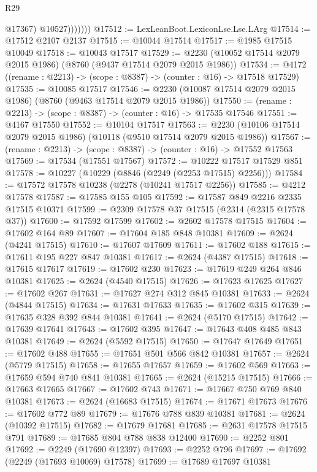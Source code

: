 \begin{lexlean}{R29}
\begin{coremodule}
                    @17367)
                  @10527)))))))
@17512 := LexLeanBoot.LexiconLse.Lse.LArg
@17514 := @17512 @2107 @2137
@17515 := @10044 @17514
@17517 := @1985 @17515 @10049
@17518 := @10043 @17517
@17529 := @2230 (@10052 @17514 @2079 @2015 @1986) (@8760 (@9437 @17514 @2079 @2015 @1986))
@17534 := @4172 ((rename : @2213) -> (scope : @8387) -> (counter : @16) -> @17518 @17529)
@17535 := @10085 @17517
@17546 := @2230 (@10087 @17514 @2079 @2015 @1986) (@8760 (@9463 @17514 @2079 @2015 @1986))
@17550 := (rename : @2213) -> (scope : @8387) -> (counter : @16) -> @17535 @17546
@17551 := @4167 @17550
@17552 := @10104 @17517
@17563 := @2230 (@10106 @17514 @2079 @2015 @1986) (@10118 (@9510 @17514 @2079 @2015 @1986))
@17567 := (rename : @2213) -> (scope : @8387) -> (counter : @16) -> @17552 @17563
@17569 := @17534 (@17551 @17567)
@17572 := @10222 @17517 @17529 @851
@17578 := @10227 (@10229 (@8846 (@2249 (@2253 @17515) @2256)))
@17584 := @17572 @17578 @10238 (@2278 (@10241 @17517 @2256))
@17585 := @4212 @17578
@17587 := @17585 @155 @105
@17592 := @17587 @849 @2216 @2335 @17515 @10371
@17599 := @2309 @17578 @37 @17515 (@2314 (@2315 @17578 @37))
@17600 := @17592 @17599
@17602 := @2602 @17578 @17515
@17604 := @17602 @164 @89
@17607 := @17604 @185 @848 @10381
@17609 := @2624 (@4241 @17515)
@17610 := @17607 @17609
@17611 := @17602 @188
@17615 := @17611 @195 @227 @847 @10381
@17617 := @2624 (@4387 @17515)
@17618 := @17615 @17617
@17619 := @17602 @230
@17623 := @17619 @249 @264 @846 @10381
@17625 := @2624 (@4540 @17515)
@17626 := @17623 @17625
@17627 := @17602 @267
@17631 := @17627 @274 @312 @845 @10381
@17633 := @2624 (@4844 @17515)
@17634 := @17631 @17633
@17635 := @17602 @315
@17639 := @17635 @328 @392 @844 @10381
@17641 := @2624 (@5170 @17515)
@17642 := @17639 @17641
@17643 := @17602 @395
@17647 := @17643 @408 @485 @843 @10381
@17649 := @2624 (@5592 @17515)
@17650 := @17647 @17649
@17651 := @17602 @488
@17655 := @17651 @501 @566 @842 @10381
@17657 := @2624 (@5779 @17515)
@17658 := @17655 @17657
@17659 := @17602 @569
@17663 := @17659 @594 @740 @841 @10381
@17665 := @2624 (@15215 @17515)
@17666 := @17663 @17665
@17667 := @17602 @743
@17671 := @17667 @750 @769 @840 @10381
@17673 := @2624 (@16683 @17515)
@17674 := @17671 @17673
@17676 := @17602 @772 @89
@17679 := @17676 @788 @839 @10381
@17681 := @2624 (@10392 @17515)
@17682 := @17679 @17681
@17685 := @2631 @17578 @17515 @791
@17689 := @17685 @804 @788 @838 @12400
@17690 := @2252 @801
@17692 := @2249 (@17690 @12397)
@17693 := @2252 @796
@17697 := @17692 (@2249 (@17693 @10069) @17578)
@17699 := @17689 @17697 @10381

\end{coremodule}
\end{lexlean}
